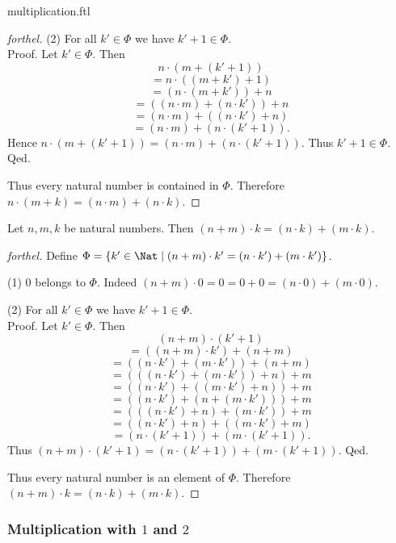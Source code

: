 \documentclass{naproche-library}
\begin{document}
\begin{smodule}{multiplication.ftl}
\begin{proof}[forthel]
    (2) For all $k' \in \Phi$ we have $k' + 1 \in \Phi$. \\
    Proof.
      Let $k'\in \Phi$.
      Then
      \[  n \cdot (m + (k' + 1))                  \]
      \[    = n \cdot ((m + k') + 1)              \]
      \[    = (n \cdot (m + k')) + n              \]
      \[    = ((n \cdot m) + (n \cdot k')) + n    \]
      \[    = (n \cdot m) + ((n \cdot k') + n)    \]
      \[    = (n \cdot m) + (n \cdot (k' + 1)).   \]
      Hence $n \cdot (m + (k' + 1)) = (n \cdot m) + (n \cdot (k' + 1))$.
      Thus $k' + 1 \in \Phi$.
    Qed.

    Thus every natural number is contained in $\Phi$.
    Therefore $n \cdot (m + k) = (n \cdot m) + (n \cdot k)$.
  \end{proof}

  \begin{proposition}[forthel,id=ARITHMETIC_06_5742967566368768,printid]
    Let $n, m, k$ be natural numbers.
    Then $(n + m) \cdot k = (n \cdot k) + (m \cdot k)$.
  \end{proposition}
  \begin{proof}[forthel]
    Define $\Phi = \{ k' \in \Nat \mid (n + m) \cdot k' = (n \cdot k') + (m \cdot k') \}$.

    (1) $0$ belongs to $\Phi$.
    Indeed $(n + m) \cdot 0
      = 0
      = 0 + 0
      = (n \cdot 0) + (m \cdot 0)$.

    (2) For all $k' \in \Phi$ we have $k' + 1 \in \Phi$. \\
    Proof.
      Let $k' \in \Phi$.
      Then
      \[  (n + m) \cdot (k' + 1)                        \]
      \[    = ((n + m) \cdot k') + (n + m)              \]
      \[    = ((n \cdot k') + (m \cdot k')) + (n + m)   \]
      \[    = (((n \cdot k') + (m \cdot k')) + n) + m   \]
      \[    = ((n \cdot k') + ((m \cdot k') + n)) + m   \]
      \[    = ((n \cdot k') + (n + (m \cdot k'))) + m   \]
      \[    = (((n \cdot k') + n) + (m \cdot k')) + m   \]
      \[    = ((n \cdot k') + n) + ((m \cdot k') + m)   \]
      \[    = (n \cdot (k' + 1)) + (m \cdot (k' + 1)).  \]
      Thus $(n + m) \cdot (k' + 1) = (n \cdot (k' + 1)) + (m \cdot (k' + 1))$.
    Qed.

    Thus every natural number is an element of $\Phi$.
    Therefore $(n + m) \cdot k = (n \cdot k) + (m \cdot k)$.
  \end{proof}


  \subsubsection*{Multiplication with $1$ and $2$}


\end{smodule}
\end{document}
